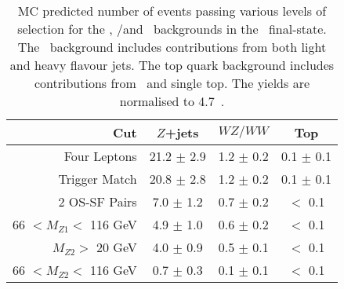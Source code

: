 \begin{table}[htbp]
  \centering
  \begin{tabular}{r|c|c|c} 
    \hline\hline
                 Cut &               $Z$+jets &             $WZ/WW$ &               Top\\ 
    \hline
        Four Leptons        &  21.2 $\pm$ 2.9  & 1.2 $\pm$ 0.2 & 0.1 $\pm$ 0.1 \\ 
       Trigger Match        &  20.8 $\pm$ 2.8  & 1.2 $\pm$ 0.2 & 0.1 $\pm$ 0.1 \\ 
       2 OS-SF Pairs        &  7.0  $\pm$ 1.2  & 0.7 $\pm$ 0.2 & $<$ 0.1 \\ 
66 $ < M_{Z1} < $ 116 GeV   &  4.9  $\pm$ 1.0  & 0.6 $\pm$ 0.2 & $<$ 0.1 \\ 
  $M_{Z2} > $ 20 GeV        &  4.0  $\pm$ 0.9  & 0.5 $\pm$ 0.1 & $<$ 0.1 \\ 
66 $ < M_{Z2} < $ 116 GeV   &  0.7  $\pm$ 0.3  & 0.1 $\pm$ 0.1 & $<$ 0.1 \\ 
    \hline\hline
  \end{tabular}
  \caption[MC predicted number of events passing various levels of selection for
  the \Zjets, \WZ/\WW and \topquark\ backgrounds in the \eemm\ final-state.]
  {MC predicted number of events passing various levels of selection for
  the \Zjets, \WZ/\WW and \topquark\ backgrounds in the \eemm\ final-state. The
  \Zjets\ background includes contributions from both light and heavy flavour
  jets. The top quark background includes contributions from \ttbar\ and
  single top. The yields are normalised to 4.7~\ifb.
  }
  \label{table:mc-bg-2e2mu}
\end{table}

